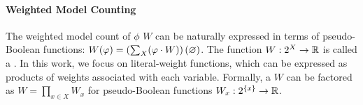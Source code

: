 
\paragraph{\textbf{Weighted Model Counting}}

The weighted model count of $\phi$ \wrt{} $W$ can be naturally expressed in terms of pseudo-Boolean functions: $W(\varphi) = \left(\sum_X (\varphi \cdot W) \right)(\varnothing)$.
The function $W: 2^X \to \mathbb{R}$ is called a .
In this work, we focus on {literal-weight functions}, which can be expressed as products of weights associated with each variable.
Formally, a  $W$ can be factored as $W = \prod_{x \in X} W_x$ for pseudo-Boolean functions $W_x: 2^{\{x\}} \to \mathbb{R}$.




